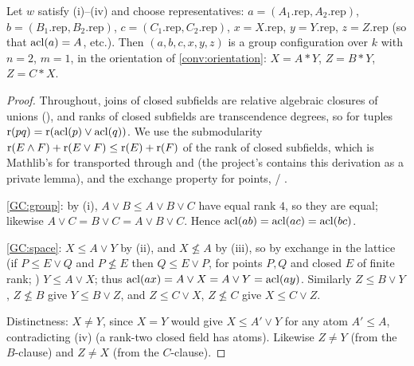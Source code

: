 \begin{proposition}\label{prop:psi-gc}
Let $w$ satisfy (i)--(iv) and choose representatives: $a=(A_1.\mathrm{rep},A_2.\mathrm{rep})$,
$b=(B_1.\mathrm{rep},B_2.\mathrm{rep})$, $c=(C_1.\mathrm{rep},C_2.\mathrm{rep})$,
$x=X.\mathrm{rep}$, $y=Y.\mathrm{rep}$, $z=Z.\mathrm{rep}$ (so that $\operatorname{acl}(a)=A$, etc.).  Then
$(a,b,c,x,y,z)$ is a group configuration over $k$ with $n=2$, $m=1$, in the orientation
of \cref{conv:orientation}: $X=A\ast Y$, $Z=B\ast Y$, $Z=C\ast X$.
\end{proposition}
\begin{proof}
Throughout, joins of closed subfields are relative algebraic closures of unions
(), and ranks of closed subfields are transcendence
degrees, so for tuples $\operatorname{r}(pq)=\operatorname{r}(\operatorname{acl}(p)\vee\operatorname{acl}(q))$.  We use the submodularity
$\operatorname{r}(E\wedge F)+\operatorname{r}(E\vee F)\le\operatorname{r}(E)+\operatorname{r}(F)$ of the rank of closed subfields, which is
Mathlib's  for
 transported through 
and  (the project's 
contains this derivation as a private lemma), and the exchange property for points,
 / .

\ref{GC:group}: by (i), $A\vee B\le A\vee B\vee C$ have equal rank $4$, so they are equal;
likewise $A\vee C=B\vee C=A\vee B\vee C$.  Hence $\operatorname{acl}(ab)=\operatorname{acl}(ac)=\operatorname{acl}(bc)$.

\ref{GC:space}: $X\le A\vee Y$ by (ii), and $X\not\le A$ by (iii), so by exchange in the
lattice (if $P\le E\vee Q$ and $P\not\le E$ then $Q\le E\vee P$, for points $P,Q$ and closed
$E$ of finite rank; ) $Y\le A\vee X$; thus
$\operatorname{acl}(ax)=A\vee X=A\vee Y=\operatorname{acl}(ay)$.  Similarly $Z\le B\vee Y$, $Z\not\le B$ give
$Y\le B\vee Z$, and $Z\le C\vee X$, $Z\not\le C$ give $X\le C\vee Z$.

Distinctness: $X\ne Y$, since $X=Y$ would give $X\le A'\vee Y$ for any atom $A'\le A$,
contradicting (iv) (a rank-two closed field has atoms).  Likewise $Z\ne Y$ (from the
$B$-clause) and $Z\ne X$ (from the $C$-clause).


\end{proof}
